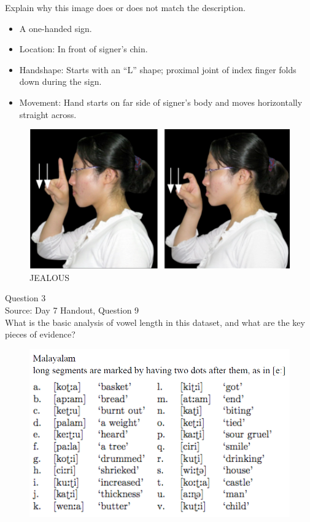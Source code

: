 \documentclass[12pt]{article}
\begin{document}
Explain why this image does or does not match the description.\\

\begin{itemize} \item A one-handed sign. \item Location: In front of signer’s chin. \item Handshape: Starts with an “L” shape; proximal joint of index finger folds down during the sign. \item Movement: Hand starts on far side of signer’s body and moves horizontally straight across. \end{itemize}

\begin{figure}[H]
\includegraphics{../images/taiwansign_jealous.png}
\caption{JEALOUS}
\end{figure}

\newpage

{\large Question 3}\\

Source: Day 7 Handout, Question 9\\

What is the basic analysis of vowel length in this dataset, and what are the key pieces of evidence?\\

\begin{figure}[H]
\includegraphics{../images/malayalam.png}
\end{figure}
\end{document}
